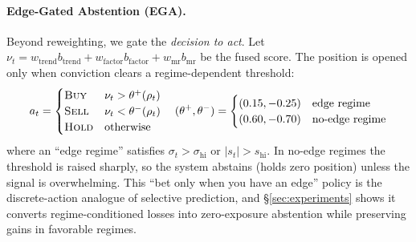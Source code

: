 \paragraph{Edge-Gated Abstention (EGA).} Beyond reweighting, we gate the \emph{decision to act}. Let $\nu_t = w_{\mathrm{trend}}b_{\mathrm{trend}} + w_{\mathrm{factor}}b_{\mathrm{factor}} + w_{\mathrm{mr}}b_{\mathrm{mr}}$ be the fused score. The position is opened only when conviction clears a regime-dependent threshold:
\begin{equation}
\label{eq:ega}
a_t =
\begin{cases}
\textsc{Buy} & \nu_t > \theta^{+}(\rho_t) \\
\textsc{Sell} & \nu_t < \theta^{-}(\rho_t) \\
\textsc{Hold} & \text{otherwise}
\end{cases}
\quad
(\theta^{+}, \theta^{-}) =
\begin{cases}
(0.15, -0.25) & \text{edge regime} \\
(0.60, -0.70) & \text{no-edge regime}
\end{cases}
\end{equation}
where an ``edge regime'' satisfies $\sigma_t > \sigma_{\mathrm{hi}}$ or $|s_t| > s_{\mathrm{hi}}$. In no-edge regimes the threshold is raised sharply, so the system abstains (holds zero position) unless the signal is overwhelming. This ``bet only when you have an edge'' policy is the discrete-action analogue of selective prediction, and \S\ref{sec:experiments} shows it converts regime-conditioned losses into zero-exposure abstention while preserving gains in favorable regimes.
